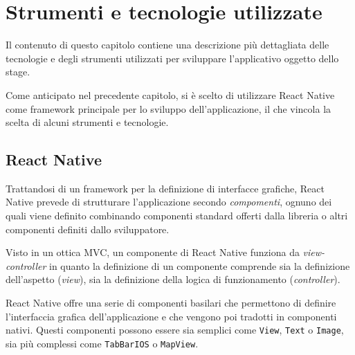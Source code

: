 
\chapter{Strumenti e tecnologie utilizzate}
\label{cap:strumenti-tecnologie}

Il contenuto di questo capitolo contiene una descrizione più dettagliata delle tecnologie e degli strumenti utilizzati per sviluppare l'applicativo oggetto dello stage.

Come anticipato nel precedente capitolo, si è scelto di utilizzare React Native come framework principale per lo sviluppo dell'applicazione, il che vincola la scelta di alcuni strumenti e tecnologie.

\section{React Native}

Trattandosi di un framework per la definizione di interfacce grafiche, React Native prevede di strutturare l'applicazione secondo \textit{compomenti}, ognuno dei quali viene definito combinando componenti standard offerti dalla libreria o altri componenti definiti dallo sviluppatore.

Visto in un ottica MVC, un componente di React Native funziona da \textit{view-controller} in quanto la definizione di un componente comprende sia la definizione dell'aspetto (\textit{view}), sia la definizione della logica di funzionamento (\textit{controller}). 

React Native offre una serie di componenti basilari che permettono di definire l'interfaccia grafica dell'applicazione e che vengono poi tradotti in componenti nativi. Questi componenti possono essere sia semplici come \texttt{View}, \texttt{Text} o \texttt{Image}, sia più complessi come \texttt{TabBarIOS} o \texttt{MapView}.


